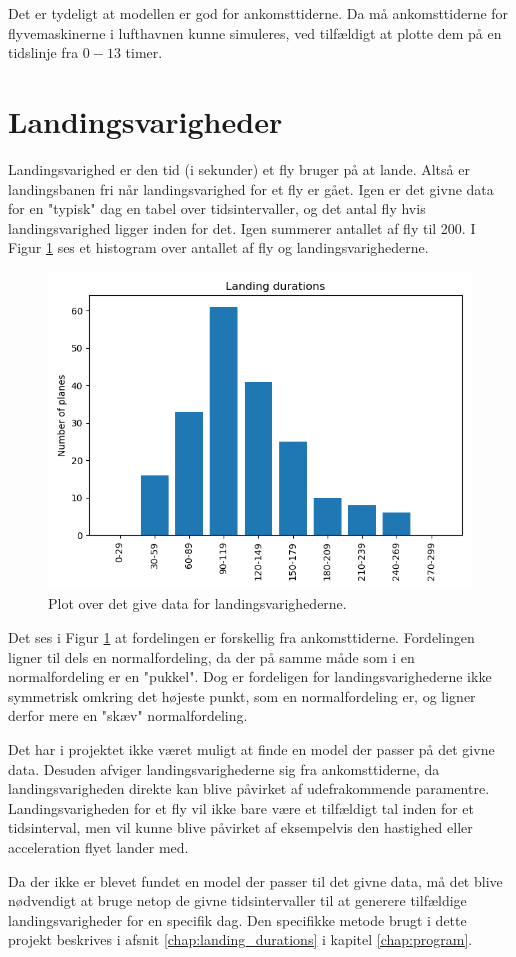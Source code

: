 Det er tydeligt at modellen er god for ankomsttiderne. Da må ankomsttiderne for flyvemaskinerne i lufthavnen kunne simuleres, ved tilfældigt at plotte dem på en tidslinje fra $0 - 13$ timer.

\section{Landingsvarigheder}
Landingsvarighed er den tid (i sekunder) et fly bruger på at lande.
Altså er landingsbanen fri når landingsvarighed for et fly er gået.
Igen er det givne data for en "typisk" dag en tabel over tidsintervaller, og det antal fly hvis landingsvarighed ligger inden for det. Igen summerer antallet af fly til 200.
I Figur \ref{fig:given_landing_durations_plot} ses et histogram over antallet af fly og landingsvarighederne.

\begin{figure}[h!]
	\centering
	\includegraphics[scale=0.6]{fig/img/given_landing_durations_plot.png}
	\caption{Plot over det give data for landingsvarighederne.} \label{fig:given_landing_durations_plot}
\end{figure}

Det ses i Figur \ref{fig:given_landing_durations_plot} at fordelingen er forskellig fra ankomsttiderne.
Fordelingen ligner til dels en normalfordeling, da der på samme måde som i en normalfordeling er en "pukkel".
Dog er fordeligen for landingsvarighederne ikke symmetrisk omkring det højeste punkt, som en normalfordeling er, og ligner derfor mere en "skæv" normalfordeling.

Det har i projektet ikke været muligt at finde en model der passer på det givne data.
Desuden afviger landingsvarighederne sig fra ankomsttiderne, da landingsvarigheden direkte kan blive påvirket af udefrakommende paramentre.
Landingsvarigheden for et fly vil ikke bare være et tilfældigt tal inden for et tidsinterval, men vil kunne blive påvirket af eksempelvis den hastighed eller acceleration flyet lander med. 

Da der ikke er blevet fundet en model der passer til det givne data, må det blive nødvendigt at bruge netop de givne tidsintervaller til at generere tilfældige landingsvarigheder for en specifik dag. Den specifikke metode brugt i dette projekt beskrives i afsnit \ref{chap:landing_durations} i kapitel \ref{chap:program}.
